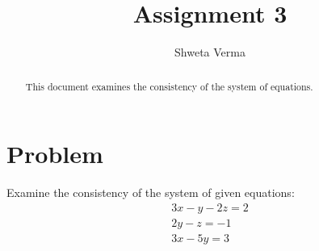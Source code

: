 \documentclass[journal,13pt,twocolumn]{IEEEtran}
\begin{document}
\title{Assignment 3} 
\author{Shweta Verma} 
\maketitle
\newpage
\bigskip
\begin{abstract}
This document examines the consistency of the system of equations.
\end{abstract}
\section{\textbf{Problem}}
Examine the consistency of the system of given equations:
\begin{align}
 3x-y-2z=2\\
 2y-z=-1\\
 3x-5y=3  
\end{align}
\end{document}
